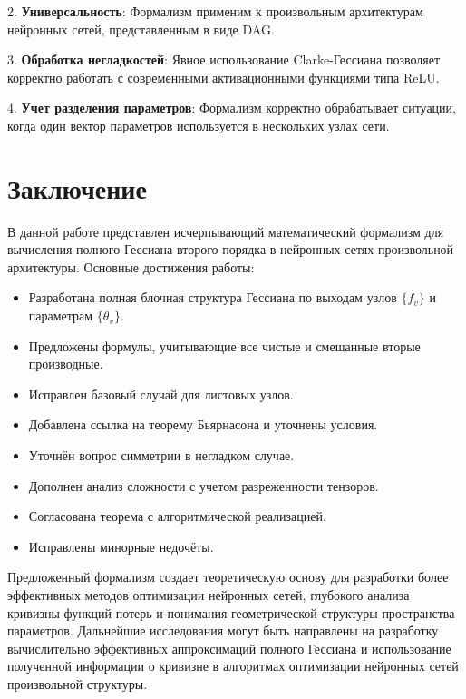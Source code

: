 \documentclass[11pt]{article}
\begin{document}
2. \textbf{Универсальность}: Формализм применим к произвольным архитектурам нейронных сетей, представленным в виде DAG.

3. \textbf{Обработка негладкостей}: Явное использование Clarke-Гессиана позволяет корректно работать с
современными активационными функциями типа ReLU.

4. \textbf{Учет разделения параметров}: Формализм корректно обрабатывает ситуации, когда один вектор
параметров используется в нескольких узлах сети.

\section{Заключение}

В данной работе представлен исчерпывающий математический формализм для вычисления полного Гессиана второго
порядка в нейронных сетях произвольной архитектуры. Основные достижения работы:

\begin{itemize}
  \item Разработана полная блочная структура Гессиана по выходам узлов $\{f_v\}$ и параметрам $\{\theta_v\}$.
  \item Предложены формулы, учитывающие все чистые и смешанные вторые производные.
  \item Исправлен базовый случай для листовых узлов.
  \item Добавлена ссылка на теорему Бьярнасона и уточнены условия.
  \item Уточнён вопрос симметрии в негладком случае.
  \item Дополнен анализ сложности с учетом разреженности тензоров.
  \item Согласована теорема с алгоритмической реализацией.
  \item Исправлены минорные недочёты.
\end{itemize}

Предложенный формализм создает теоретическую основу для разработки более эффективных методов оптимизации
нейронных сетей, глубокого анализа кривизны функций потерь и понимания геометрической структуры пространства
параметров. Дальнейшие исследования могут быть направлены на разработку вычислительно эффективных
аппроксимаций полного Гессиана и использование полученной информации о кривизне в алгоритмах оптимизации
нейронных сетей произвольной структуры.
\end{document}
